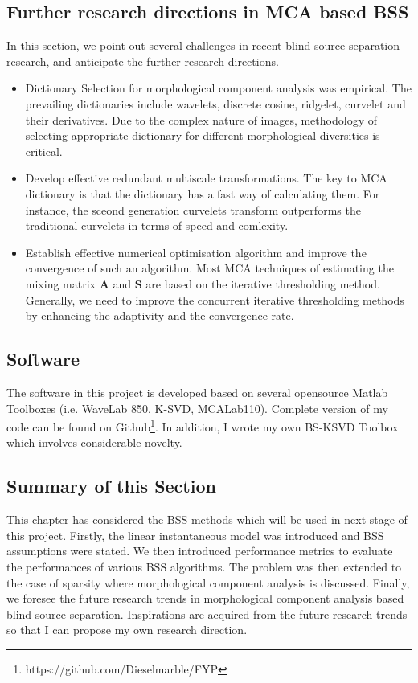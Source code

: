 \subsection{Further research directions in MCA based BSS}
In this section, we point out several challenges in recent blind source separation research, and anticipate the further research directions.\\
\begin{itemize}
    \item Dictionary Selection for morphological component analysis was empirical. The prevailing dictionaries include wavelets, discrete cosine, ridgelet, curvelet and their derivatives. Due to the complex nature of images, methodology of selecting appropriate dictionary for different  morphological diversities is critical.
    \item Develop effective redundant multiscale transformations. The key to MCA dictionary is that the dictionary has a fast way of calculating them. For instance, the sceond generation curvelets transform outperforms the traditional curvelets in terms of speed and comlexity.
    \item Establish effective numerical optimisation algorithm and improve the convergence of such an algorithm. Most MCA techniques of estimating the mixing matrix $\mathbf{A}$ and $\mathbf{S}$ are based on the iterative thresholding method. Generally, we need to improve the concurrent iterative thresholding methods by enhancing the adaptivity and the convergence rate.
\end{itemize}

\subsection{Software}
The software in this project is developed based on several opensource Matlab Toolboxes (i.e. WaveLab 850, K-SVD, MCALab110). Complete version of my code can be found on Github\footnote{https://github.com/Dieselmarble/FYP}. In addition, I wrote my own BS-KSVD Toolbox which involves considerable novelty.



\subsection{Summary of this Section}
This chapter has considered the BSS methods which will be used in next stage of this project. Firstly, the linear instantaneous model was introduced and BSS assumptions were stated. We then introduced performance metrics to evaluate the performances of various BSS algorithms. The problem was then extended to the case of sparsity where morphological component analysis is discussed. Finally, we foresee the future research trends in morphological component analysis based blind source separation. Inspirations are acquired from the future research trends so that I can propose my own research direction.

